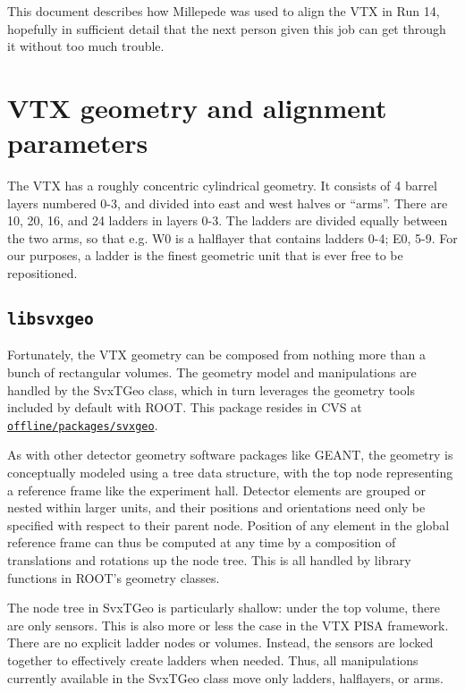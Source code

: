 \documentclass[12pt]{article}
\begin{document}
This document describes how Millepede was used to align the VTX in Run 14, hopefully in sufficient detail that the next person given this job can get through it without too much trouble.

\section{VTX geometry and alignment parameters}
The VTX has a roughly concentric cylindrical geometry. It consists of 4 barrel layers numbered 0-3, and divided into east and west halves or ``arms''. There are 10, 20, 16, and 24 ladders in layers 0-3. The ladders are divided equally between the two arms, so that e.g. W0 is a halflayer that contains ladders 0-4; E0, 5-9. For our purposes, a ladder is the finest geometric unit that is ever free to be repositioned.

\subsection{\texttt{libsvxgeo}}
Fortunately, the VTX geometry can be composed from nothing more than a bunch of rectangular volumes. The geometry model and manipulations are handled by the SvxTGeo class, which in turn leverages the geometry tools included by default with ROOT. This package resides in CVS at \href{https://www.phenix.bnl.gov/viewvc/viewvc.cgi/phenix/offline/packages/svxgeo}{\texttt{offline/\-packages/\-svxgeo}}.

\medskip
As with other detector geometry software packages like GEANT, the geometry is conceptually modeled using a tree data structure, with the top node representing a reference frame like the experiment hall. Detector elements are grouped or nested within larger units, and their positions and orientations need only be specified with respect to their parent node. Position of any element in the global reference frame can thus be computed at any time by a composition of translations and rotations up the node tree. This is all handled by library functions in ROOT's geometry classes.

The node tree in SvxTGeo is particularly shallow: under the top volume, there are only sensors. This is also more or less the case in the VTX PISA framework.
There are no explicit ladder nodes or volumes. Instead, the sensors are locked together to effectively create ladders when needed. Thus, all manipulations currently available in the SvxTGeo class move only ladders, halflayers, or arms.
\end{document}
